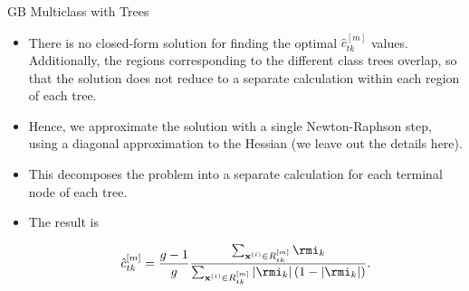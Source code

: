 \documentclass[11pt,compress,t,notes=noshow, xcolor=table]{beamer}
\begin{document}
\begin{vbframe}{GB Multiclass with Trees}


\framebreak


\begin{itemize}

  \item There is no closed-form solution for finding the optimal $\hat{c}_{tk}^{[m]}$ values. Additionally, the regions corresponding to the different class trees overlap, so that the solution does not reduce to a separate calculation within each region of each tree.

  \item Hence, we approximate the solution with a single Newton-Raphson step, using a diagonal approximation to the Hessian (we leave out the details here).

  \item This decomposes the problem into a separate calculation for each terminal node of each tree.

  \item The result is

  $$\hat{c}_{tk}^{[m]} =
      \frac{g-1}{g}\frac{\sum_{\xi \in R_{tk}^{[m]}} \rmi_k}{\sum_{\xi \in R_{tk}^{[m]}} \left|\rmi_k\right|\left(1 - \left|\rmi_k\right|\right)}.$$


\end{itemize}

\framebreak




\end{vbframe}
\end{document}
